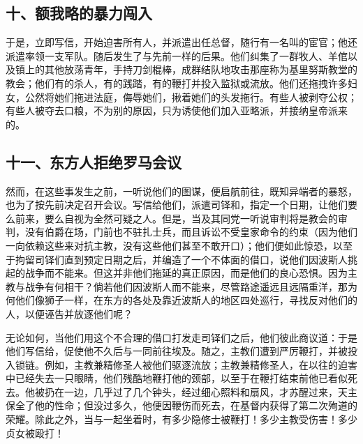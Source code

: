 
\subsection{十、额我略的暴力闯入}

于是，立即写信，开始迫害所有人，并派遣出任总督，随行有一名叫的宦官；他还派遣率领一支军队。随后发生了与先前一样的后果。他们纠集了一群牧人、羊倌以及镇上的其他放荡青年，手持刀剑棍棒，成群结队地攻击那座称为基里努斯教堂的教会；他们有的杀人，有的践踏，有的鞭打并投入监狱或流放。他们还拖拽许多妇女，公然将她们拖进法庭，侮辱她们，揪着她们的头发拖行。有些人被剥夺公权；有些人被夺去口粮，不为别的原因，只为诱使他们加入亚略派，并接纳皇帝派来的。\par


\subsection{十一、东方人拒绝罗马会议}

然而，在这些事发生之前，一听说他们的图谋，便启航前往，既知异端者的暴怒，也为了按先前决定召开会议。写信给他们，派遣司铎和，指定一个日期，让他们要么前来，要么自视为全然可疑之人。但是，当及其同党一听说审判将是教会的审判，没有伯爵在场，门前也不驻扎士兵，而且诉讼不受皇家命令的约束（因为他们一向依赖这些来对抗主教，没有这些他们甚至不敢开口）；他们便如此惊恐，以至于拘留司铎们直到预定日期之后，并编造了一个不体面的借口，说他们因波斯人挑起的战争而不能来。但这并非他们拖延的真正原因，而是他们的良心恐惧。因为主教与战争有何相干？倘若他们因波斯人而不能来，尽管路途遥远且远隔重洋，那为何他们像狮子一样，在东方的各处及靠近波斯人的地区四处巡行，寻找反对他们的人，以便诬告并放逐他们呢？\par

无论如何，当他们用这个不合理的借口打发走司铎们之后，他们彼此商议道：于是他们写信给，促使他不久后与一同前往埃及。随之，主教们遭到严厉鞭打，并被投入锁链。例如，主教兼精修圣人被他们驱逐流放；主教兼精修圣人，在以往的迫害中已经失去一只眼睛，他们残酷地鞭打他的颈部，以至于在鞭打结束前他已看似死去。他被扔在一边，几乎过了几个钟头，经过细心照料和扇风，才苏醒过来，天主保全了他的性命；但没过多久，他便因鞭伤而死去，在基督内获得了第二次殉道的荣耀。除此之外，当与一起坐着时，有多少隐修士被鞭打！多少主教受伤害！多少贞女被殴打！\par


